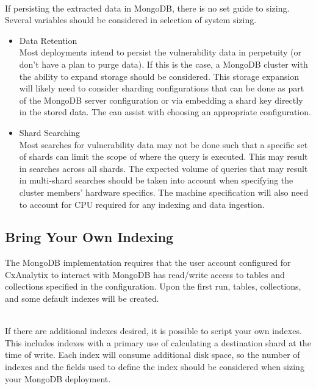 \noindent\\If persisting the extracted data in MongoDB, there is no set guide to sizing. Several variables should be considered in selection of system sizing.

\begin{itemize}
    \item Data Retention\\
    Most deployments intend to persist the vulnerability data in perpetuity (or don't have a plan to purge data). 
    If this is the case, a MongoDB cluster with the ability to expand storage should be considered. This storage expansion will likely need to consider 
    sharding configurations that can be done as part of the MongoDB server configuration or via embedding a shard key directly in the stored data. 
    The  can assist with choosing an appropriate configuration.

    \item Shard Searching\\
    Most searches for vulnerability data may not be done such that a specific set of shards can limit the scope of where the query is executed. This may result
    in searches across all shards. The expected volume of queries that may result in multi-shard searches should be taken into account when specifying the 
    cluster members' hardware specifics. The machine specification will also need to account for CPU required for any indexing and data ingestion.
\end{itemize}

\subsection{Bring Your Own Indexing}

The MongoDB implementation requires that the user account configured for CxAnalytix to interact with MongoDB has read/write access to tables and 
collections specified in the configuration.  Upon the first run, tables, collections, and some default indexes will be created.

\noindent\\If there are additional indexes desired, it is possible to script your own indexes.  This includes indexes with a primary use of calculating a
destination shard at the time of write.  Each index will consume additional disk space, so the number of indexes and the fields used to define the index
should be considered when sizing your MongoDB deployment.


